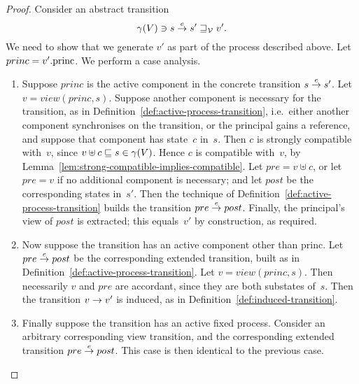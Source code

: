 \begin{proof} 
Consider an abstract transition
\[
\gamma(V) \ni s \stackrel{e}\rightarrow s' \sqsupseteq_{\mathcal{V}} v'.
\]
We need to show that we generate $v'$ as part of the process described above.
Let  $princ = v'.\mathrm{princ}$.
We perform a case analysis.
%
\begin{enumerate}
\item
Suppose $princ$ is the active component in the concrete transition
\( {s \stackrel{e}\rightarrow s'} \).
Let $v = view(princ, s)$.  
%
Suppose another component is necessary for the transition, as in
Definition~\ref{def:active-process-transition}, i.e.~either another component
synchronises on the transition, or the principal gains a reference, and
suppose that component has state~$c$ in~$s$.  Then $c$ is strongly compatible
with~$v$, since $v \uplus c \sqsubseteq s \in \gamma(V)$.  Hence $c$ is compatible
with~$v$, by Lemma~\ref{lem:strong-compatible-implies-compatible}.
%
Let $pre = v \uplus c$, or let $pre = v$ if no additional component is
necessary; and let $post$ be the corresponding states in~$s'$.  Then the
technique of Definition~\ref{def:active-process-transition} builds the
transition \( pre \stackrel{e}\rightarrow post \).  Finally, the principal's view of $post$
is extracted; this equals~$v'$ by construction, as required. 


\item
Now suppose the transition has an active component other than princ.  Let $pre
\stackrel{e}\rightarrow post$ be the corresponding extended transition, built as in
Definition~\ref{def:active-process-transition}.  Let $v = view(princ, s)$.
Then necessarily $v$ and $pre$ are accordant, since they are both substates
of~$s$.  Then the transition $v \stackrel{}\rightarrow v'$ is induced, as in
Definition~\ref{def:induced-transition}.

\item
Finally suppose the transition has an active fixed process.  Consider an
arbitrary corresponding view transition, and the corresponding extended
transition $pre \stackrel{e}\rightarrow post$.  This case is then identical to the previous
case.
\end{enumerate}
\end{proof}





